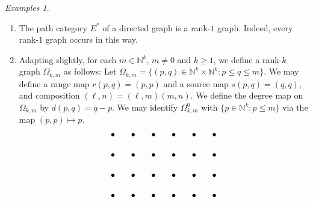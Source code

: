\documentclass[12pt]{amsart}
\theoremstyle{definition}
\theoremstyle{remark}
\newtheorem{examples}[thm]{Examples}
\numberwithin{equation}{section}
\newcommand{\NN}{\mathbb{N}}
\begin{document}
\begin{examples} \label{ex:omega}
\begin{enumerate}[leftmargin=1cm,label={(\roman *)}]
\item The path category $E^*$ of a directed graph is a rank-$1$ graph. Indeed, every rank-$1$ graph occurs in this way.
\item Adapting \cite{RSY1} slightly, for each $m \in \NN^k$, $m \neq 0$ and $k \ge 1$, we define a rank-$k$ graph $\Omega_{k,m}$ as follows:
Let $\Omega_{k,m} = \{(p,q) \in \NN^k \times \NN^k : p \le q \le m\}$. 
We may define a range map $r(p,q) = (p,p)$ and a source map $s(p,q) = (q,q)$, and composition $( \ell,n) = ( \ell,m) (m,n)$. We define the degree map on $\Omega_{k,m}$ by $d(p,q) = q-p$. We may identify $\Omega_{k,m}^0$ with $\{p \in \NN^k : p \le m\}$ via the map $(p,p) \mapsto p$. 
\[
\begin{tikzpicture}[scale=0.85]

\node[inner sep=2.5pt] at (0,0) {\tiny $\bullet$};
\node[inner sep=2.5pt] at (0,1) {\tiny $\bullet$};
\node[inner sep=2.5pt] at (0,2) {\tiny $\bullet$};
\node[inner sep=2.5pt] at (0,3) {\tiny $\bullet$};


\node[inner sep=2.5pt] at (1,0) {\tiny $\bullet$};
\node[inner sep=2.5pt] at (1,1) {\tiny $\bullet$};
\node[inner sep=2.5pt] at (1,2) {\tiny $\bullet$};
\node[inner sep=2.5pt] at (1,3) {\tiny $\bullet$};


\node[inner sep=2.5pt] at (2,0) {\tiny $\bullet$};
\node[inner sep=2.5pt] at (2,1) {\tiny $\bullet$};
\node[inner sep=2.5pt] at (2,2) {\tiny $\bullet$};
\node[inner sep=2.5pt] at (2,3) {\tiny $\bullet$};


\node[inner sep=2.5pt] at (3,0) {\tiny $\bullet$};
\node[inner sep=2.5pt] at (3,1) {\tiny $\bullet$};
\node[inner sep=2.5pt] at (3,2) {\tiny $\bullet$};
\node[inner sep=2.5pt] at (3,3) {\tiny $\bullet$};


\node[inner sep=2.5pt] at (4,0) {\tiny $\bullet$};
\node[inner sep=2.5pt] at (4,1) {\tiny $\bullet$};
\node[inner sep=2.5pt] at (4,2) {\tiny $\bullet$};
\node[inner sep=2.5pt] at (4,3) {\tiny $\bullet$};


\node[inner sep=2.5pt] at (5,0) {\tiny $\bullet$};
\node[inner sep=2.5pt] at (5,1) {\tiny $\bullet$};
\node[inner sep=2.5pt] at (5,2) {\tiny $\bullet$};
\node[inner sep=2.5pt] at (5,3) {\tiny $\bullet$};



\end{tikzpicture}\]
\end{enumerate}
\end{examples}
\end{document}
